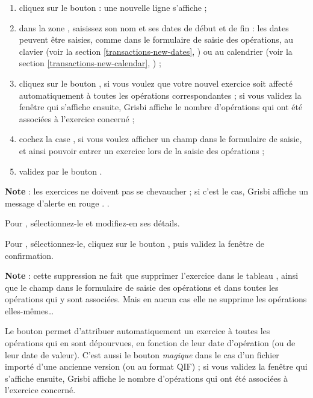 \begin{enumerate}
	\item cliquez sur le bouton  : une nouvelle ligne  s'affiche ;
	\item dans la zone  , saisissez son nom et ses dates de début et de fin : les dates peuvent être saisies, comme dans le formulaire de saisie des opérations, au clavier (voir la section \vref{transactions-new-dates}, ) ou au calendrier (voir la section \vref{transactions-new-calendar}, ) ;
	\item cliquez sur le bouton , si vous voulez que votre nouvel exercice soit affecté automatiquement à toutes les opérations correspondantes ; si vous validez la fenêtre qui s'affiche ensuite, Grisbi affiche le nombre d'opérations qui ont été associées à l'exercice concerné ;
	\item cochez la case , si vous voulez afficher un champ   dans le formulaire de saisie, et ainsi pouvoir entrer un exercice lors de la saisie des opérations ;
	\item validez par le bouton .
\end{enumerate}

\textbf{Note} : les exercices ne doivent pas se chevaucher ; si c'est le cas, Grisbi affiche un message d'alerte en rouge{\couleur} \ifIllustration {}.
\else .
\fi

Pour , sélectionnez-le et modifiez-en ses détails.

Pour , sélectionnez-le, cliquez sur le bouton , puis validez la fenêtre de confirmation. 

\textbf{Note} : cette suppression ne fait que supprimer l'exercice dans le tableau , ainsi que le champ  dans le formulaire de saisie des opérations et dans toutes les opérations qui y sont associées. Mais en aucun cas elle ne supprime les opérations elles-mêmes\ldots

Le bouton  permet d'attribuer automatiquement un exercice à toutes les opérations qui en sont dépourvues, en fonction de leur date d'opération (ou de leur date de valeur). C'est aussi le bouton \emph{magique} dans le cas d'un fichier importé d'une ancienne version (ou au format QIF) ; si vous validez la fenêtre qui s'affiche ensuite, Grisbi affiche le nombre d'opérations qui ont été associées à l'exercice concerné.

